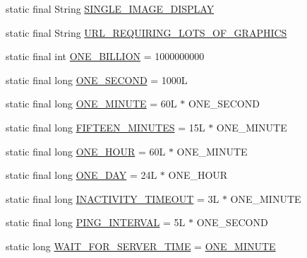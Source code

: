 \begin{DoxyCompactItemize}
\item 
static final String \hyperlink{classgov_1_1fnal_1_1ppd_1_1dd_1_1GlobalVariables_ab018dd06fadda0d1bc99e7de66894e84}{S\-I\-N\-G\-L\-E\-\_\-\-I\-M\-A\-G\-E\-\_\-\-D\-I\-S\-P\-L\-A\-Y}
\item 
static final String \hyperlink{classgov_1_1fnal_1_1ppd_1_1dd_1_1GlobalVariables_aaf1f42e774f4d514f50578db3ea33733}{U\-R\-L\-\_\-\-R\-E\-Q\-U\-I\-R\-I\-N\-G\-\_\-\-L\-O\-T\-S\-\_\-\-O\-F\-\_\-\-G\-R\-A\-P\-H\-I\-C\-S}
\item 
static final int \hyperlink{classgov_1_1fnal_1_1ppd_1_1dd_1_1GlobalVariables_a271c983add4bac415412025c8ac2f4cc}{O\-N\-E\-\_\-\-B\-I\-L\-L\-I\-O\-N} = 1000000000
\item 
static final long \hyperlink{classgov_1_1fnal_1_1ppd_1_1dd_1_1GlobalVariables_a3718d8133f257fcc337f5131c8e22d48}{O\-N\-E\-\_\-\-S\-E\-C\-O\-N\-D} = 1000\-L
\item 
static final long \hyperlink{classgov_1_1fnal_1_1ppd_1_1dd_1_1GlobalVariables_a79fc1e35198b44168537a85aa4c2d942}{O\-N\-E\-\_\-\-M\-I\-N\-U\-T\-E} = 60\-L $\ast$ O\-N\-E\-\_\-\-S\-E\-C\-O\-N\-D
\item 
static final long \hyperlink{classgov_1_1fnal_1_1ppd_1_1dd_1_1GlobalVariables_ae09d2d42603daf3b4d5fccd1c489a93b}{F\-I\-F\-T\-E\-E\-N\-\_\-\-M\-I\-N\-U\-T\-E\-S} = 15\-L $\ast$ O\-N\-E\-\_\-\-M\-I\-N\-U\-T\-E
\item 
static final long \hyperlink{classgov_1_1fnal_1_1ppd_1_1dd_1_1GlobalVariables_a947f75994e24bb52604adf3699920579}{O\-N\-E\-\_\-\-H\-O\-U\-R} = 60\-L $\ast$ O\-N\-E\-\_\-\-M\-I\-N\-U\-T\-E
\item 
static final long \hyperlink{classgov_1_1fnal_1_1ppd_1_1dd_1_1GlobalVariables_aef5cbdf53c9830ae609987b805a08998}{O\-N\-E\-\_\-\-D\-A\-Y} = 24\-L $\ast$ O\-N\-E\-\_\-\-H\-O\-U\-R
\item 
static final long \hyperlink{classgov_1_1fnal_1_1ppd_1_1dd_1_1GlobalVariables_ab33d116e6a83d46d778ee5c3521a39a4}{I\-N\-A\-C\-T\-I\-V\-I\-T\-Y\-\_\-\-T\-I\-M\-E\-O\-U\-T} = 3\-L $\ast$ O\-N\-E\-\_\-\-M\-I\-N\-U\-T\-E
\item 
static final long \hyperlink{classgov_1_1fnal_1_1ppd_1_1dd_1_1GlobalVariables_ac2e535e1d551e5eae9749ad1ff4eeccf}{P\-I\-N\-G\-\_\-\-I\-N\-T\-E\-R\-V\-A\-L} = 5\-L $\ast$ O\-N\-E\-\_\-\-S\-E\-C\-O\-N\-D
\item 
static long \hyperlink{classgov_1_1fnal_1_1ppd_1_1dd_1_1GlobalVariables_ab1fa16703a549d62b7ceaf50f6beb881}{W\-A\-I\-T\-\_\-\-F\-O\-R\-\_\-\-S\-E\-R\-V\-E\-R\-\_\-\-T\-I\-M\-E} = \hyperlink{classgov_1_1fnal_1_1ppd_1_1dd_1_1GlobalVariables_a79fc1e35198b44168537a85aa4c2d942}{O\-N\-E\-\_\-\-M\-I\-N\-U\-T\-E}

\end{DoxyCompactItemize}
